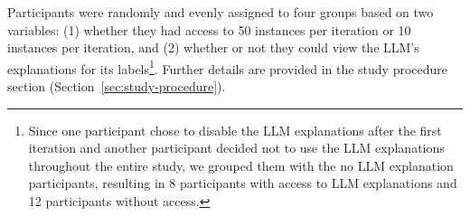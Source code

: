 Participants were randomly and evenly assigned to four groups based on two variables: 
(1) whether they had access to 50 instances per iteration or 10 instances per iteration, and
(2) whether or not they could view the LLM's explanations for its labels\footnote{Since one participant chose to disable the LLM explanations after the first iteration and another participant decided not to use the LLM explanations throughout the entire study, we grouped them with the no LLM explanation participants, resulting in 8 participants with access to LLM explanations and 12 participants without access.}.
Further details are provided in the study procedure section (Section~\ref{sec:study-procedure}). 

